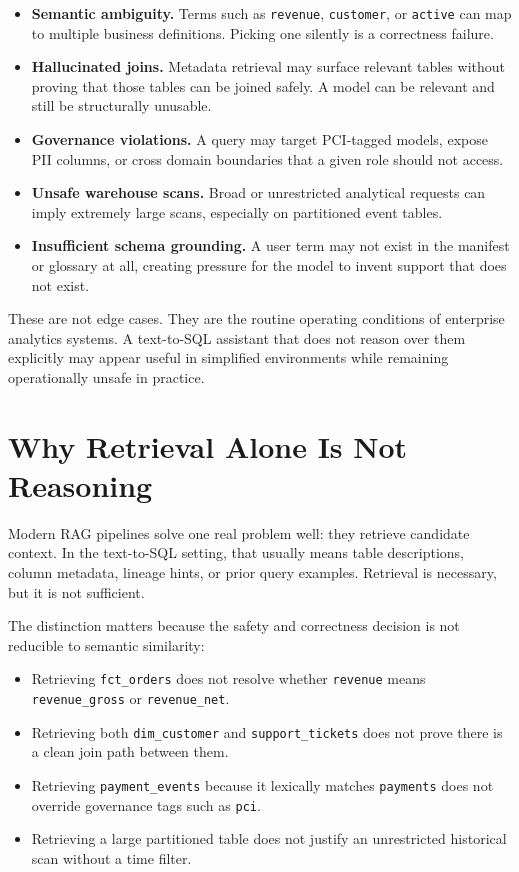 \documentclass[11pt]{article}
\begin{document}
\begin{itemize}[leftmargin=1.4em]
  \item \textbf{Semantic ambiguity.} Terms such as \texttt{revenue}, \texttt{customer}, or \texttt{active} can map to multiple business definitions. Picking one silently is a correctness failure.
  \item \textbf{Hallucinated joins.} Metadata retrieval may surface relevant tables without proving that those tables can be joined safely. A model can be relevant and still be structurally unusable.
  \item \textbf{Governance violations.} A query may target PCI-tagged models, expose PII columns, or cross domain boundaries that a given role should not access.
  \item \textbf{Unsafe warehouse scans.} Broad or unrestricted analytical requests can imply extremely large scans, especially on partitioned event tables.
  \item \textbf{Insufficient schema grounding.} A user term may not exist in the manifest or glossary at all, creating pressure for the model to invent support that does not exist.
\end{itemize}

These are not edge cases. They are the routine operating conditions of enterprise analytics systems. A text-to-SQL assistant that does not reason over them explicitly may appear useful in simplified environments while remaining operationally unsafe in practice.

\section{Why Retrieval Alone Is Not Reasoning}

Modern RAG pipelines solve one real problem well: they retrieve candidate context. In the text-to-SQL setting, that usually means table descriptions, column metadata, lineage hints, or prior query examples. Retrieval is necessary, but it is not sufficient.

The distinction matters because the safety and correctness decision is not reducible to semantic similarity:

\begin{itemize}[leftmargin=1.4em]
  \item Retrieving \texttt{fct\_orders} does not resolve whether \texttt{revenue} means \texttt{revenue\_gross} or \texttt{revenue\_net}.
  \item Retrieving both \texttt{dim\_customer} and \texttt{support\_tickets} does not prove there is a clean join path between them.
  \item Retrieving \texttt{payment\_events} because it lexically matches \texttt{payments} does not override governance tags such as \texttt{pci}.
  \item Retrieving a large partitioned table does not justify an unrestricted historical scan without a time filter.
\end{itemize}
\end{document}
